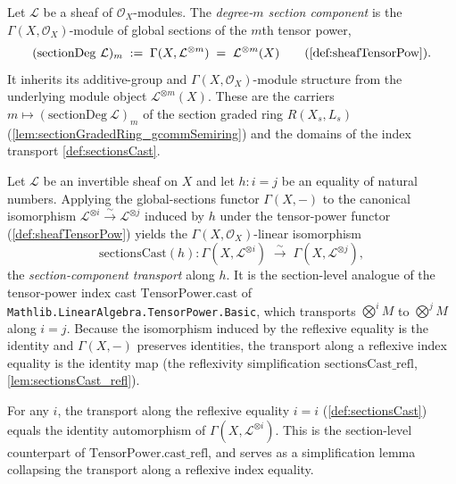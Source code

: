 \begin{definition}
  \label{def:sectionDeg}
  Let \(\mathcal{L}\) be a sheaf of \(\mathcal{O}_X\)-modules. The
  \emph{degree-\(m\) section component} is the \(\Gamma(X,\mathcal{O}_X)\)-module of
  global sections of the \(m\)th tensor power,
  \[
    (\mathrm{sectionDeg}\ \mathcal{L})_m
      \;:=\; \Gamma(X, \mathcal{L}^{\otimes m})
      \;=\; \mathcal{L}^{\otimes m}(X)
        \qquad(\cref{def:sheafTensorPow}).
  \]
  It inherits its additive-group and \(\Gamma(X,\mathcal{O}_X)\)-module structure
  from the underlying module object \(\mathcal{L}^{\otimes m}(X)\). These are the
  carriers \(m \mapsto (\mathrm{sectionDeg}\ \mathcal{L})_m\) of the section graded
  ring \(R(X_s, L_s)\) (\cref{lem:sectionGradedRing_gcommSemiring}) and the
  domains of the index transport \cref{def:sectionsCast}.
\end{definition}

\begin{definition}
  \label{def:sectionsCast}
  Let \(\mathcal{L}\) be an invertible sheaf on \(X\) and let \(h : i = j\) be an
  equality of natural numbers. Applying the global-sections functor
  \(\Gamma(X,-)\) to the canonical isomorphism
  \(\mathcal{L}^{\otimes i} \xrightarrow{\sim} \mathcal{L}^{\otimes j}\) induced by
  \(h\) under the tensor-power functor (\cref{def:sheafTensorPow}) yields the
  \(\Gamma(X,\mathcal{O}_X)\)-linear isomorphism
  \[
    \mathrm{sectionsCast}(h) :
    \Gamma(X, \mathcal{L}^{\otimes i}) \;\xrightarrow{\ \sim\ }\;
    \Gamma(X, \mathcal{L}^{\otimes j}),
  \]
  the \emph{section-component transport} along \(h\). It is the section-level
  analogue of the tensor-power index cast \(\mathrm{TensorPower.cast}\) of
  \texttt{Mathlib.LinearAlgebra.TensorPower.Basic}, which transports
  \(\bigotimes^{i} M\) to \(\bigotimes^{j} M\) along \(i = j\). Because the
  isomorphism induced by the reflexive equality is the identity and
  \(\Gamma(X,-)\) preserves identities, the transport along a reflexive index
  equality is the identity map (the reflexivity simplification
  \(\mathrm{sectionsCast\_refl}\), \cref{lem:sectionsCast_refl}).
\end{definition}

\begin{lemma}
  \label{lem:sectionsCast_refl}
  For any \(i\), the transport along the reflexive equality \(i = i\)
  (\cref{def:sectionsCast}) equals the identity automorphism of
  \(\Gamma(X, \mathcal{L}^{\otimes i})\). This is the section-level counterpart of
  \(\mathrm{TensorPower.cast\_refl}\), and serves as a simplification lemma
  collapsing the transport along a reflexive index equality.
\end{lemma}

